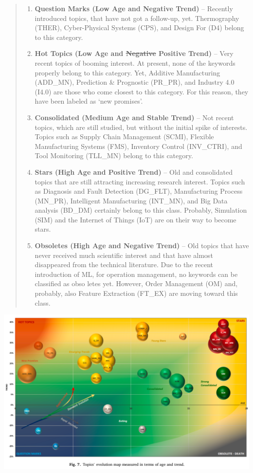 \documentclass[
  letterpaper,
  DIV=11,
  numbers=noendperiod]{scrartcl}
\providecommand{\tightlist}{%
  \setlength{\itemsep}{0pt}\setlength{\parskip}{0pt}}\usepackage{longtable,booktabs,array}
\begin{document}
\begin{itemize}
\begin{quote}
  \begin{enumerate}
  \def\labelenumi{\arabic{enumi}.}
  \tightlist
  \item
    \textbf{Question Marks (Low Age and Negative Trend)} -- Recently
    introduced topics, that have not got a follow-up, yet. Thermography
    (THER), Cyber-Physical Systems (CPS), and Design For (D4) belong to
    this category.
  \item
    \textbf{Hot Topics (Low Age and \sout{Negative} Positive Trend)} --
    Very recent topics of booming interest. At present, none of the
    keywords properly belong to this category. Yet, Additive
    Manufacturing (ADD\_MN), Prediction \& Prognostic (PR\_PR), and
    Industry 4.0 (I4.0) are those who come closest to this category. For
    this reason, they have been labeled as `new promises'.
  \item
    \textbf{Consolidated (Medium Age and Stable Trend)} -- Not recent
    topics, which are still studied, but without the initial spike of
    interests. Topics such as Supply Chain Management (SCMI), Flexible
    Manufacturing Systems (FMS), Inventory Control (INV\_CTRI), and Tool
    Monitoring (TLL\_MN) belong to this category.
  \item
    \textbf{Stars (High Age and Positive Trend)} -- Old and consolidated
    topics that are still attracting increasing research interest.
    Topics such as Diagnosis and Fault Detection (DG\_FLT),
    Manufacturing Process (MN\_PR), Intelligent Manufacturing (INT\_MN),
    and Big Data analysis (BD\_DM) certainly belong to this class.
    Probably, Simulation (SIM) and the Internet of Things (IoT) are on
    their way to become stars.
  \item
    \textbf{Obsoletes (High Age and Negative Trend)} -- Old topics that
    have never received much scientific interest and that have almost
    disappeared from the technical literature. Due to the recent
    introduction of ML, for operation management, no keywords can be
    classified as obso­ letes yet. However, Order Management (OM) and,
    probably, also Feature Extraction (FT\_EX) are moving toward this
    class.
  \end{enumerate}
  \end{quote}

  \includegraphics{img/2023-01-07-12-44-41.png}
\end{itemize}
\end{document}
